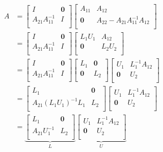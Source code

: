 \documentclass[leqno]{article}
\begin{document}
\begin{enumerate}
    \begin{align*}
        A&=\begin{bmatrix}
        I & \textbf{0}\\
        A_{21}A_{11}^{-1} & I\\
        \end{bmatrix}\begin{bmatrix}
        A_{11} & A_{12}\\
        \textbf{0} & A_{22}-A_{21}A_{11}^{-1}A_{12}\\
        \end{bmatrix}\\
        &=\begin{bmatrix}
        I & \textbf{0}\\
        A_{21}A_{11}^{-1} & I\\
        \end{bmatrix}\begin{bmatrix}
        L_1U_1 & A_{12}\\
        \textbf{0} & L_2U_2\\
        \end{bmatrix}\\
        &=\begin{bmatrix}
        I & \textbf{0}\\
        A_{21}A_{11}^{-1} & I\\
        \end{bmatrix}\begin{bmatrix}
        L_1 & \textbf{0}\\
        \textbf{0} & L_2\\
        \end{bmatrix}\begin{bmatrix}
        U_1 & L_1^{-1}A_{12}\\
        \textbf{0} & U_2\\
        \end{bmatrix}\\
        &=\begin{bmatrix}
        L_1 & \textbf{0}\\
        A_{21}(L_1U_1)^{-1}L_1 & L_2\\
        \end{bmatrix}\begin{bmatrix}
        U_1 & L_1^{-1}A_{12}\\
        \textbf{0} & U_2\\
        \end{bmatrix}\\
        &=\underbrace{\begin{bmatrix}
        L_1 & \textbf{0}\\
        A_{21}U_1^{-1} & L_2\\
        \end{bmatrix}}_{L}\underbrace{\begin{bmatrix}
        U_1 & L_1^{-1}A_{12}\\
        \textbf{0} & U_2\\
        \end{bmatrix}}_{U}
    \end{align*}
    
\end{enumerate}

 
\end{document}
